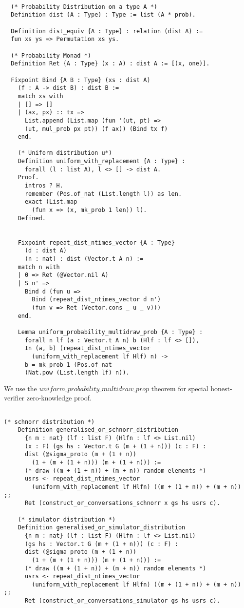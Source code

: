 \documentclass[conference,compsoc]{IEEEtran}
\begin{document}
  \begin{lstlisting}[language=Coq]
    
  (* Probability Distribution on a type A *)
  Definition dist (A : Type) : Type := list (A * prob).

  Definition dist_equiv {A : Type} : relation (dist A) := 
  fun xs ys => Permutation xs ys.

  (* Probability Monad *)
  Definition Ret {A : Type} (x : A) : dist A := [(x, one)].

  Fixpoint Bind {A B : Type} (xs : dist A)  
    (f : A -> dist B) : dist B := 
    match xs with 
    | [] => [] 
    | (ax, px) :: tx => 
      List.append (List.map (fun '(ut, pt) => 
      (ut, mul_prob px pt)) (f ax)) (Bind tx f)
    end.
    
    (* Uniform distribution u*)
    Definition uniform_with_replacement {A : Type} : 
      forall (l : list A), l <> [] -> dist A.
    Proof.
      intros ? H.
      remember (Pos.of_nat (List.length l)) as len.
      exact (List.map 
        (fun x => (x, mk_prob 1 len)) l).
    Defined.

    
    Fixpoint repeat_dist_ntimes_vector {A : Type} 
      (d : dist A) 
      (n : nat) : dist (Vector.t A n) := 
    match n with 
    | 0 => Ret (@Vector.nil A)
    | S n' => 
      Bind d (fun u => 
        Bind (repeat_dist_ntimes_vector d n')
        (fun v => Ret (Vector.cons _ u _ v)))
    end.

    Lemma uniform_probability_multidraw_prob {A : Type} :
      forall n lf (a : Vector.t A n) b (Hlf : lf <> []), 
      In (a, b) (repeat_dist_ntimes_vector 
        (uniform_with_replacement lf Hlf) n) ->
      b = mk_prob 1 (Pos.of_nat 
      (Nat.pow (List.length lf) n)).
  \end{lstlisting}

  
  We use the $uniform\_probability\_multidraw\_prop$ theorem 
  for special honest-verifier zero-knowledge proof. 

  \begin{lstlisting}[language=Coq]

(* schnorr distribution *)
    Definition generalised_or_schnorr_distribution  
      {n m : nat} (lf : list F) (Hlfn : lf <> List.nil) 
      (x : F) (gs hs : Vector.t G (m + (1 + n))) (c : F) : 
      dist (@sigma_proto (m + (1 + n)) 
        (1 + (m + (1 + n))) (m + (1 + n))) :=
      (* draw ((m + (1 + n)) + (m + n)) random elements *)
      usrs <- repeat_dist_ntimes_vector 
        (uniform_with_replacement lf Hlfn) ((m + (1 + n)) + (m + n)) ;;
      Ret (construct_or_conversations_schnorr x gs hs usrs c).

    (* simulator distribution *)
    Definition generalised_or_simulator_distribution  
      {n m : nat} (lf : list F) (Hlfn : lf <> List.nil) 
      (gs hs : Vector.t G (m + (1 + n))) (c : F) : 
      dist (@sigma_proto (m + (1 + n)) 
        (1 + (m + (1 + n))) (m + (1 + n))) :=
      (* draw ((m + (1 + n)) + (m + n)) random elements *)
      usrs <- repeat_dist_ntimes_vector 
        (uniform_with_replacement lf Hlfn) ((m + (1 + n)) + (m + n)) ;;
      Ret (construct_or_conversations_simulator gs hs usrs c).
    
  \end{lstlisting}
\end{document}
